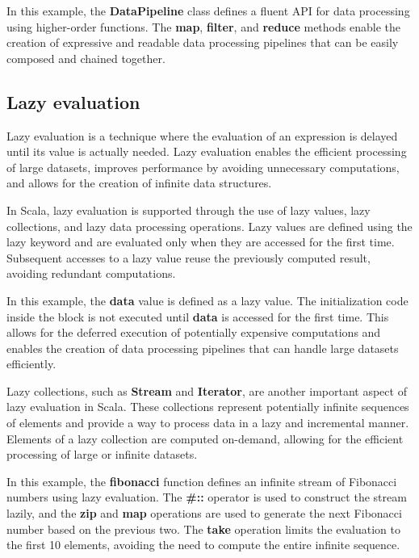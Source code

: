

In this example, the \textbf{DataPipeline} class defines a fluent API for data processing using higher-order functions. The \textbf{map}, \textbf{filter}, and \textbf{reduce} methods enable the creation of expressive and readable data processing pipelines that can be easily composed and chained together.\footnotemark {}

\subsection{Lazy evaluation}

Lazy evaluation is a technique where the evaluation of an expression is delayed until its value is actually needed. Lazy evaluation enables the efficient processing of large datasets, improves performance by avoiding unnecessary computations, and allows for the creation of infinite data structures.

In Scala, lazy evaluation is supported through the use of lazy values, lazy collections, and lazy data processing operations. Lazy values are defined using the lazy keyword and are evaluated only when they are accessed for the first time. Subsequent accesses to a lazy value reuse the previously computed result, avoiding redundant computations.



In this example, the \textbf{data} value is defined as a lazy value. The initialization code inside the block is not executed until \textbf{data} is accessed for the first time. This allows for the deferred execution of potentially expensive computations and enables the creation of data processing pipelines that can handle large datasets efficiently.

Lazy collections, such as \textbf{Stream} and \textbf{Iterator}, are another important aspect of lazy evaluation in Scala. These collections represent potentially infinite sequences of elements and provide a way to process data in a lazy and incremental manner. Elements of a lazy collection are computed on-demand, allowing for the efficient processing of large or infinite datasets.



In this example, the \textbf{fibonacci} function defines an infinite stream of Fibonacci numbers using lazy evaluation. The \textbf{\#::} operator is used to construct the stream lazily, and the \textbf{zip} and \textbf{map} operations are used to generate the next Fibonacci number based on the previous two. The \textbf{take} operation limits the evaluation to the first 10 elements, avoiding the need to compute the entire infinite sequence.

